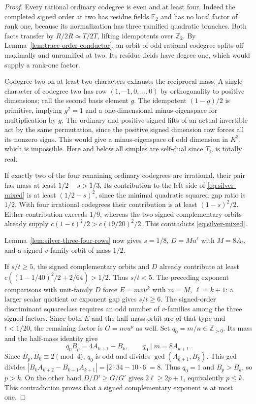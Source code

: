\documentclass[11pt,reqno]{amsart}
\theoremstyle{remark}\newtheorem{remark}[theorem]{Remark}
\numberwithin{equation}{section}
\begin{document}
\begin{proof}
Every rational ordinary codegree is even and at least four.
Indeed the completed signed order at two has residue fields
$\mathbb F_2$ and has no local factor of rank one, because its
normalization has three ramified quadratic branches. Both facts
transfer by $R/2R\simeq T/2T$, lifting idempotents over
$\mathbb Z_2$. By Lemma~\ref{lem:trace-order-conductor}, an orbit of
odd rational codegree splits off maximally and unramified at two.
Its residue fields have degree one, which would supply a rank-one factor.

Codegree two on at least
two characters exhausts the reciprocal mass. A single character of
codegree two has row $(1,-1,0,\ldots,0)$ by orthogonality to
positive dimensions; call the second basis element $g$. The
idempotent $(1-g)/2$ is primitive, implying $g^2=1$ and a
one-dimensional minus-eigenspace for multiplication by $g$.
The ordinary and positive signed lifts of an actual invertible
act by the same permutation, since the positive signed dimension
row forces all its nonzero signs. This would give a minus-eigenspace
of odd dimension in $K^3$, which is impossible. Here and below all
simples are self-dual since $T_{\mathbb Q}$ is totally real.

If exactly two of the four remaining ordinary codegrees are
irrational, their pair has mass at least $1/2-s>1/3$. Its
contribution to the left side of \eqref{eq:silver-mixed} is at
least $(1/2-s)^2$, since the minimal quadratic squared gap ratio
is $1/2$. With four irrational codegrees their contribution is
at least $(1-s)^2/2$. Either contribution exceeds $1/9$, whereas
the two signed complementary orbits already supply
$c(1-t)^2/2>c(19/20)^2/2$. This contradicts \eqref{eq:silver-mixed}.

Lemma~\ref{lem:silver-three-four-rows} now gives $s=1/8$,
$D=Mu^\ell$ with $M=8A_\ell$, and a signed $v$-family orbit of
mass $1/2$.

If $s/t\ge5$, the signed complementary orbits and $D$ already
contribute at least
$c((1-1/40)^2/2+2/64)>1/2$. Thus $s/t<5$.
The preceding exponent comparisons with unit-family $D$ force
$E=mvu^k$ with $m=M$, $\ell=k+1$: a larger scalar quotient
or exponent gap gives $s/t\ge 6$.
The signed-order discriminant squareclass requires an odd number
of $v$-families among the three signed factors. Since both $E$
and the half-mass orbit are of that type and $t<1/20$, the remaining
factor is $G=nvu^p$ as well. Set $q_0=m/n\in\mathbb Z_{>0}$. Its
mass and the half-mass identity give
\[
 q_0B_p=4A_{k+1}-B_k,\qquad q_0\mid m=8A_{k+1}.
\]
Since $B_p,B_k\equiv2\pmod4$, $q_0$ is odd and divides
$\gcd(A_{k+1},B_k)$. This gcd divides
$|B_kA_{k+2}-B_{k+1}A_{k+1}|=|2\cdot34-10\cdot6|=8$.
Thus $q_0=1$ and $B_p>B_k$, so $p>k$. On the other hand
$D/D'\ge G/G'$ gives $2\ell\ge2p+1$, equivalently $p\le k$.
This contradiction proves that a signed complementary exponent is
at most one.


\end{proof}
\end{document}
